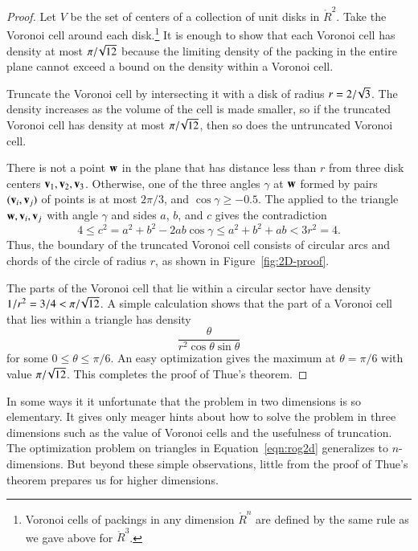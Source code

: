\figOCULYIA %

\begin{proof}
Let $V$ be the set of centers of a collection of unit disks in
$\ring{R}^2$.  Take the Voronoi cell around each
disk.\footnote{Voronoi cells of packings in any dimension $\ring{R}^n$
  are defined by the same rule as we gave above for $\ring{R}^3$.}   It
is enough to show that each Voronoi cell has density at most
$\pi/\!\sqrt{12}$ because the limiting density of the packing in the entire plane cannot exceed
a bound on the density within a Voronoi cell.  


Truncate the Voronoi cell by intersecting it with a disk of radius
$r=2/\!\sqrt3$.   The density increases as the volume of the cell is made smaller,
so if the truncated Voronoi cell
has density at most $\pi/\!\sqrt{12}$, then so does the untruncated Voronoi cell.

There is not a point ${\mathbf w}$ in the plane that has distance  less than $r$
from three disk centers ${\mathbf v}_1,{\mathbf v}_2,{\mathbf v}_3$.  Otherwise, one of the three
angles $\gamma$ at ${\mathbf w}$ formed by pairs $({\mathbf v}_i,{\mathbf v}_j)$ of points
 is at most $2\pi/3$, and $\cos\gamma\ge -0.5$.
The  applied to the triangle ${\mathbf w},{\mathbf v}_i,{\mathbf v}_j$ with angle
$\gamma$ and sides $a$, $b$, and $c$ gives the contradiction
   \[ 
   4 \le c^2 = a^2 + b^2 - 2 a b \cos\gamma 
   \le a^2 + b^2 + a b < 3r^2 = 4.
   \] 
Thus, the boundary of the truncated Voronoi cell consists of circular
arcs and chords of the circle of radius $r$, as shown in Figure~\ref{fig:2D-proof}.

\figSENQMWT %

The parts of the Voronoi cell that lie within a circular sector have
density $1/r^2 = 3/4 < \pi/\!\sqrt{12}$.  A simple calculation shows
that the part of a Voronoi cell that lies within a triangle has
density
   \begin{equation}\label{eqn:rog2d}
   \frac{\theta}{r^2 \cos\theta\sin\theta}
   \end{equation}
for some $0 \le \theta\le \pi/6$.  An easy optimization gives the maximum
at $\theta=\pi/6$ with value $\pi/\!\sqrt{12}$.  This completes the proof of Thue's theorem.
\end{proof}

In some ways it it unfortunate that the problem in two dimensions is
so elementary.  It gives only meager hints about how to solve the problem
in three dimensions such as the value of Voronoi cells
and the usefulness of truncation.  The optimization problem on
triangles in Equation~\ref{eqn:rog2d} generalizes to $n$-dimensions.
But beyond these simple observations,  little from the proof of Thue's
theorem prepares us for higher dimensions.

